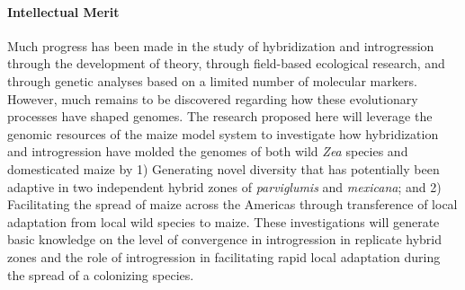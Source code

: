 
%

\paragraph{Intellectual Merit}  Much progress has been made in the study of hybridization and introgression through the development of theory, through field-based ecological research, and through genetic analyses based on a limited number of molecular markers. However, much remains to be discovered regarding how these evolutionary processes have shaped genomes. The research proposed here will leverage the genomic resources of the maize model system to investigate how hybridization and introgression have molded the genomes of both wild \emph{Zea} species and domesticated maize by 1) Generating novel diversity that has potentially been adaptive in two independent hybrid zones of \emph{parviglumis} and \emph{mexicana}; and 2) Facilitating the spread of maize across the Americas through transference of local adaptation from local wild species to maize. These investigations will generate basic knowledge on the level of convergence in introgression in replicate hybrid zones and the role of introgression in facilitating rapid local adaptation during the spread of a colonizing species.


